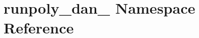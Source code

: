 \hypertarget{namespacerunpoly__dan__6}{\section{runpoly\-\_\-dan\-\_ Namespace Reference}
\label{namespacerunpoly__dan__6}
}
